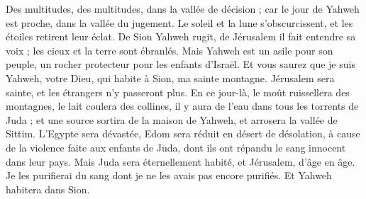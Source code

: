 \begin{multicols}{2}
Des multitudes, des multitudes, dans la vallée de décision ; car le jour de Yahweh est proche, dans la vallée du jugement.
Le soleil et la lune s’obscurcissent, et les étoiles retirent leur éclat.
De Sion Yahweh rugit, de Jérusalem il fait entendre sa voix ; les cieux et la terre sont ébranlés. Mais Yahweh est un asile pour son peuple, un rocher protecteur pour les enfants d’Israël.
Et vous saurez que je suis Yahweh, votre Dieu, qui habite à Sion, ma sainte montagne. Jérusalem sera sainte, et les étrangers n'y passeront plus.
En ce jour-là, le moût ruissellera des montagnes, le lait coulera des collines, il y aura de l’eau dans tous les torrents de Juda ; et une source sortira de la maison de Yahweh, et arrosera la vallée de Sittim.
L'Egypte sera dévastée, Edom sera réduit en désert de désolation, à cause de la violence faite aux enfants de Juda, dont ils ont répandu le sang innocent dans leur pays.
Mais Juda sera éternellement habité, et Jérusalem, d’âge en âge.
Je les purifierai du sang dont je ne les avais pas encore purifiés. Et Yahweh habitera dans Sion.
\PPE{}
\end{multicols}
